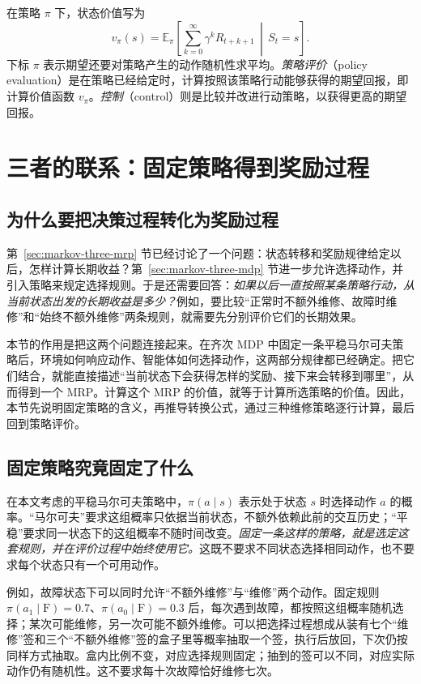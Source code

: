 \documentclass[UTF8,12pt,a4paper,fontset=fandol]{ctexart}
\begin{document}
在策略 $\pi$ 下，状态价值写为
\begin{equation}
  v_\pi(s)=\mathbb E_\pi\left[
    \sum_{k=0}^{\infty}\gamma^kR_{t+k+1}\,\middle|\,S_t=s
  \right].
  \label{eq:markov-three-policy-value}
\end{equation}
下标 $\pi$ 表示期望还要对策略产生的动作随机性求平均。\emph{策略评价}（policy evaluation）是在策略已经给定时，计算按照该策略行动能够获得的期望回报，即计算价值函数 $v_\pi$。\emph{控制}（control）则是比较并改进行动策略，以获得更高的期望回报。

\section{三者的联系：固定策略得到奖励过程}
\label{sec:markov-three-connection}

\subsection{为什么要把决策过程转化为奖励过程}

第~\ref{sec:markov-three-mrp} 节已经讨论了一个问题：状态转移和奖励规律给定以后，怎样计算长期收益？第~\ref{sec:markov-three-mdp} 节进一步允许选择动作，并引入策略来规定选择规则。于是还需要回答：\emph{如果以后一直按照某条策略行动，从当前状态出发的长期收益是多少？}例如，要比较“正常时不额外维修、故障时维修”和“始终不额外维修”两条规则，就需要先分别评价它们的长期效果。

本节的作用是把这两个问题连接起来。在齐次 MDP 中固定一条平稳马尔可夫策略后，环境如何响应动作、智能体如何选择动作，这两部分规律都已经确定。把它们结合，就能直接描述“当前状态下会获得怎样的奖励、接下来会转移到哪里”，从而得到一个 MRP。计算这个 MRP 的价值，就等于计算所选策略的价值。因此，本节先说明固定策略的含义，再推导转换公式，通过三种维修策略逐行计算，最后回到策略评价。

\subsection{固定策略究竟固定了什么}

在本文考虑的平稳马尔可夫策略中，$\pi(a\mid s)$ 表示处于状态 $s$ 时选择动作 $a$ 的概率。“马尔可夫”要求这组概率只依据当前状态，不额外依赖此前的交互历史；“平稳”要求同一状态下的这组概率不随时间改变。\emph{固定一条这样的策略，就是选定这套规则，并在评价过程中始终使用它。}这既不要求不同状态选择相同动作，也不要求每个状态只有一个可用动作。

例如，故障状态下可以同时允许“不额外维修”与“维修”两个动作。固定规则 $\pi(a_1\mid\mathrm F)=0.7$、$\pi(a_0\mid\mathrm F)=0.3$ 后，每次遇到故障，都按照这组概率随机选择；某次可能维修，另一次可能不额外维修。可以把选择过程想成从装有七个“维修”签和三个“不额外维修”签的盒子里等概率抽取一个签，执行后放回，下次仍按同样方式抽取。盒内比例不变，对应选择规则固定；抽到的签可以不同，对应实际动作仍有随机性。这不要求每十次故障恰好维修七次。
\end{document}
